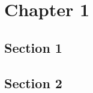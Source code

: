 \chapter{Chapter 1}
\label{cha:ch1}

\cite{Book01}

\section{Section 1}
\label{sec:ch1sec1}

\cite{MAN02}

\section{Section 2}
\label{sec:ch1sec2}

\cite{ART03}
